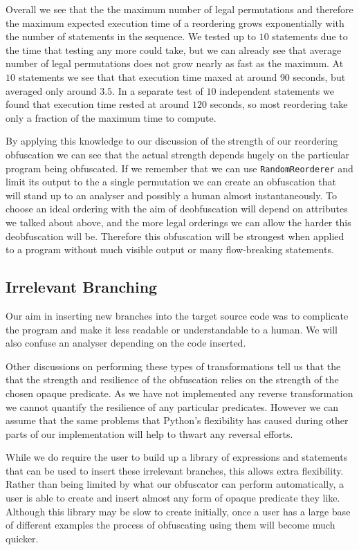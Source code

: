 \documentclass[twoside,a4paper]{report}
\begin{document}
Overall we see that the the maximum number of legal permutations and therefore the maximum expected execution time of a reordering grows exponentially
with the number of statements in the sequence. We tested up to $10$ statements due to the time that testing any more could take, but we can already see
that average number of legal permutations does not grow nearly as fast as the maximum. At $10$ statements we see that that execution time maxed at around
$90$ seconds, but averaged only around $3.5$. In a separate test of $10$ independent statements we found that execution time rested at around $120$ seconds,
so most reordering take only a fraction of the maximum time to compute.

By applying this knowledge to our discussion of the strength of our reordering obfuscation we can see that the actual strength depends hugely on the
particular program being obfuscated. If we remember that we can use \texttt{RandomReorderer} and limit its output to the a single permutation we can
create an obfuscation that will stand up to an analyser and possibly a human almost instantaneously. To choose an ideal ordering with the aim of
deobfuscation will depend on attributes we talked about above, and the more legal orderings we can allow the harder this deobfuscation will be. Therefore
this obfuscation will be strongest when applied to a program without much visible output or many flow-breaking statements.

\subsection{Irrelevant Branching}

Our aim in inserting new branches into the target source code was to complicate the program and make it less readable or understandable to a human. We will
also confuse an analyser depending on the code inserted.

Other discussions on performing these types of transformations \cite{taxobftrans} tell us that the that the strength and resilience of the obfuscation relies
on the strength of the chosen opaque predicate. As we have not implemented any reverse transformation we cannot quantify the resilience of any particular
predicates. However we can assume that the same problems that Python's flexibility has caused during other parts of our implementation will help to thwart
any reversal efforts.

While we do require the user to build up a library of expressions and statements that can be used to insert these irrelevant branches, this allows extra
flexibility. Rather than being limited by what our obfuscator can perform automatically, a user is able to create and insert almost any form of opaque
predicate they like. Although this library may be slow to create initially, once a user has a large base of different examples the process of obfuscating using
them will become much quicker.
\end{document}
